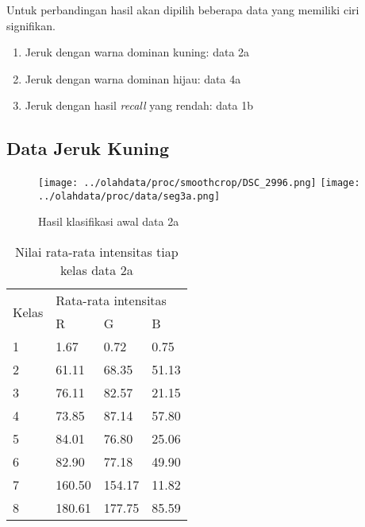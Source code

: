 \documentclass[laporan.tex]{subfiles}
\begin{document}
Untuk perbandingan hasil akan dipilih beberapa data yang memiliki ciri signifikan.

\begin{enumerate}
\item Jeruk dengan warna dominan kuning: data 2a
\item Jeruk dengan warna dominan hijau: data 4a
\item Jeruk dengan hasil \emph{recall} yang rendah: data 1b
\end{enumerate}

\subsection{Data Jeruk Kuning}

\begin{figure}[h!]
\centering
\texttt{[image: ../olahdata/proc/smoothcrop/DSC\_2996.png]}
\texttt{[image: ../olahdata/proc/data/seg3a.png]}
\caption[]{Hasil klasifikasi awal data 2a}
\end{figure}

\begin{table}[h!]
\centering
\begin{tabular}{|l|l|l|l|}
\cline{1-4}
\multirow{2}{*}{Kelas} & \multicolumn{3}{l|}{Rata-rata intensitas} \\
\cline{2-4}
 & R & G & B \\
\cline{1-4}
1 & 1.67 & 0.72 & 0.75 \\
2 & 61.11 & 68.35 & 51.13 \\
3 & 76.11 & 82.57 & 21.15 \\
4 & 73.85 & 87.14 & 57.80 \\
5 & 84.01 & 76.80 & 25.06 \\
6 & 82.90 & 77.18 & 49.90 \\
7 & 160.50 & 154.17 & 11.82 \\
8 & 180.61 & 177.75 & 85.59 \\
\cline{1-4}
\end{tabular}
\caption[]{Nilai rata-rata intensitas tiap kelas data 2a}
\label{table:avgyellow1}
\end{table}
\end{document}
